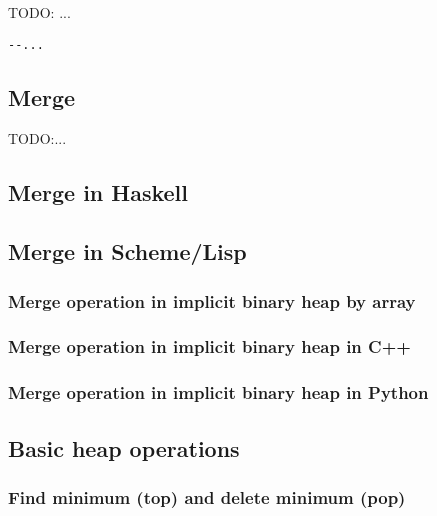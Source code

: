 \documentclass{article}
\begin{document}
TODO: ...

\lstset{language=lisp}
\begin{lstlisting}
--...
\end{lstlisting}

\subsection{Merge}

TODO:...

\subsection*{Merge in Haskell}

\subsection*{Merge in Scheme/Lisp}

\subsubsection{Merge operation in implicit binary heap by array}

\subsubsection*{Merge operation in implicit binary heap in C++}

\subsubsection*{Merge operation in implicit binary heap in Python}

\subsection{Basic heap operations}

\subsubsection{Find minimum (top) and delete minimum (pop)}
\end{document}
